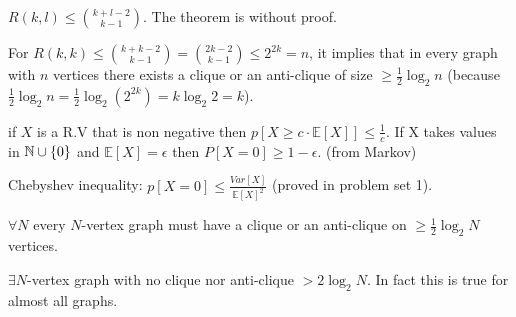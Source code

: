 \begin{thm}
 $R\left(k,l\right)\le{k+l-2 \choose k-1}$. The theorem is without
proof.

For $R\left(k,k\right)\le{k+k-2 \choose k-1}=\binom{2k-2}{k-1}\le2^{2k}=n$,
it implies that in every graph with $n$ vertices there exists a clique
or an anti-clique of size $\ge\frac{1}{2}\log_{2}n$ (because $\frac{1}{2}\log_{2}n=\frac{1}{2}\log_{2}\left(2^{2k}\right)=k\log_{2}2=k$). 

\end{thm}

\begin{remark}
\label{probRVreualsZero}if $X$ is a R.V that is non negative then
$p\left[X\ge c\cdot\mathbb{E}\left[X\right]\right]\le\frac{1}{c}$.
If X takes values in $\mathbb{N}\cup\left\{ 0\right\} $ and $\mathbb{E}\left[X\right]=\epsilon$
then $P\left[X=0\right]\ge1-\epsilon$. (from Markov) 
\end{remark}

\begin{remark}
Chebyshev inequality: $p\left[X=0\right]\le\frac{Var\left[X\right]}{\mathbb{E}\left[X\right]^{2}}$
(proved in problem set 1).
\end{remark}

\begin{corollary}
$\forall N$ every $N$-vertex graph must have a clique or an anti-clique
on $\ge\frac{1}{2}\log_{2}N$ vertices.
\end{corollary}

\begin{thm}[Erdos '47]
 $\exists N$-vertex graph with no clique nor anti-clique $>2\log_{2}N$.
In fact this is true for almost all graphs.
\end{thm}

